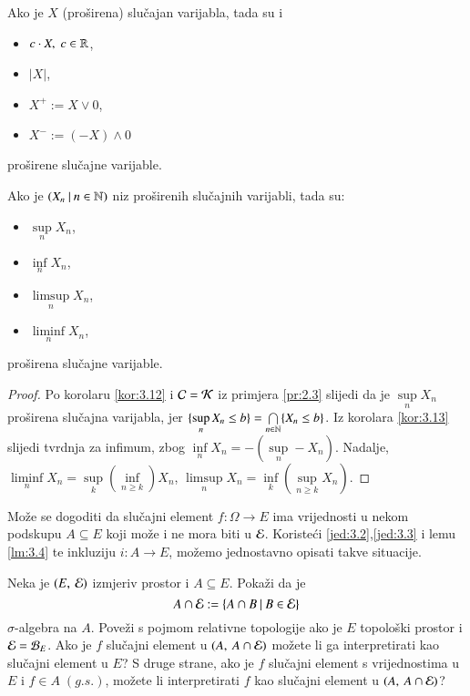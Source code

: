\begin{kor} \label{kor:3.13}
    Ako je $X$ (pro\v sirena) slu\v cajan varijabla, tada su i
    \begin{itemize}[label=]
        \item $c \cdot X, \; c \in \mathbb{R}$,
        \item $|X|$,
        \item $X^+ := X \lor 0$,
        \item $X^- := (-X) \land 0$
    \end{itemize}
    pro\v sirene slu\v cajne varijable.
\end{kor}

\begin{kor} \label{kor:3.14}
    Ako je $({X_n} \: | \: {n \in \mathbb{N}})$ niz pro\v sirenih slu\v cajnih varijabli, tada su:
    \begin{itemize}[label=]
        \item $\sup\limits_{n} X_n$,
        \item $\inf\limits_{n} X_n$,
        \item $\limsup\limits_{n} X_n$,
        \item $\liminf\limits_{n} X_n$,
    \end{itemize}
    pro\v sirena slu\v cajne varijable.
\end{kor}

\begin{proof}
    Po korolaru \ref{kor:3.12} i $\mathcal{C} = \mathcal{K}$ iz primjera \ref{pr:2.3} slijedi da je $\sup\limits_n X_n$ pro\v sirena slu\v cajna varijabla, jer $\{ \sup\limits_n X_n \leq b \} = \bigcap\limits_{n \in \mathbb{N}}^{} \{ X_n \leq b \}$.
    Iz korolara \ref{kor:3.13} slijedi tvrdnja za infimum, zbog $\inf\limits_n X_n = - (\sup\limits_n - X_n)$.
    Nadalje, $\liminf\limits_n X_n = \sup\limits_k (\inf\limits_{n \geq k}) X_n$, $\limsup\limits_n X_n = \inf\limits_k (\sup\limits_{n\geq k} X_n)$.
\end{proof}

Mo\v ze se dogoditi da slu\v cajni element $f:\Omega \to E$ ima vrijednosti u nekom podskupu $A \subseteq E$ koji mo\v ze i ne mora biti u $\mathcal{E}$. Koriste\' ci \eqref{jed:3.2},\eqref{jed:3.3} i lemu \ref{lm:3.4} te inkluziju $i: A \to E$, mo\v zemo jednostavno opisati takve situacije.

\begin{zad} \label{zad:3.15}
    Neka je $(E, \: \mathcal{E})$ izmjeriv prostor i $A \subseteq E$.
    Poka\v zi da je
    \begin{equation*}
        A \cap \mathcal{E} := \{{A \cap B} \: | \: {B \in \mathcal{E}}\}
    \end{equation*}
    $\sigma$-algebra na $A$.
    Pove\v zi s pojmom relativne topologije ako je $E$ topolo\v ski prostor i $\mathcal{E} = \mathcal{B}_{E}$.
    Ako je $f$ slu\v cajni element u $(A, \: A \cap \mathcal{E})$ mo\v zete li ga interpretirati kao slu\v cajni element u $E$?
    S druge strane, ako je $f$ slu\v cajni element s vrijednostima u $E$ i $f \in A \; (g.s.)$, mo\v zete li interpretirati $f$ kao slu\v cajni element u $({A}, \: {A \cap \mathcal{E}})$?
\end{zad}

